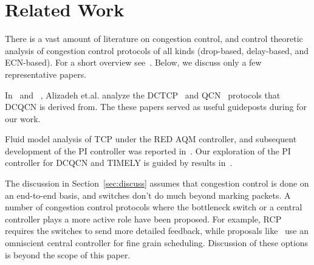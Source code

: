 \section{Related Work}
\label{sec:related}

There is a vast amount of literature on congestion control, and control
theoretic analysis of congestion control protocols of all kinds (drop-based,
delay-based, and ECN-based). For a short overview see~\cite{srikantbook}. Below,
we discuss only a few representative papers.

In~\cite{dctcp-analysis} and ~\cite{qcn-analysis}, Alizadeh et.al. analyze the
DCTCP~\cite{dctcp} and QCN~\cite{qcn} protocols that DCQCN is derived from. The
these papers served as useful guideposts during for our work.

Fluid model analysis of TCP under the RED AQM controller, and subsequent
development of the PI controller was reported
in~\cite{misra2000fluid,hollot2001designing}. Our exploration of the PI
controller for DCQCN and TIMELY is guided by results
in~\cite{hollot2001designing}.

The discussion in Section~\ref{sec:discuss} assumes that congestion control is
done on an end-to-end basis, and switches don't do much beyond marking packets.
A number of congestion control protocols where the bottleneck switch or a
central controller plays a more active role have been proposed. For example,
RCP~\cite{dukkipati2006rcp} requires the switches to send more detailed
feedback, while proposals like~\cite{vattikonda2012practical,wilson2011better}
use an omniscient central controller for fine grain scheduling. Discussion of
these options is beyond the scope of this paper.
